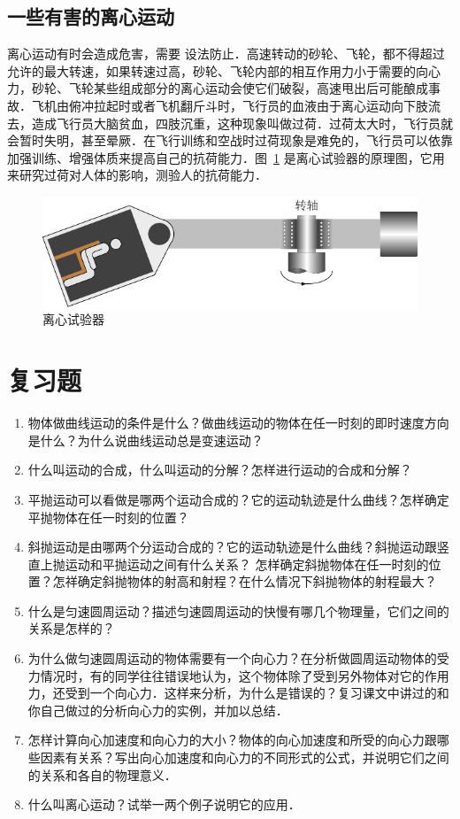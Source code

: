\subsection{一些有害的离心运动} 

离心运动有时会造成危害，需要
设法防止．高速转动的砂轮、飞轮，都不得超过允许的最大转速，如果转速过高，砂轮、飞轮内部的相互作用力小于需要的向心力，砂轮、飞轮某些组成部分的离心运动会使它们破裂，高速甩出后可能酿成事故．飞机由俯冲拉起时或者飞机翻斤斗时，飞行员的血液由于离心运动向下肢流去，造成飞行员大脑贫血，四肢沉重，这种现象叫做过荷．过荷太大时，飞行员就会暂时失明，甚至晕厥．在飞行训练和空战时过荷现象是难免的，飞行员可以依靠加强训练、增强体质来提高自己的抗荷能力．图~\ref{fig_A_4-31} 是离心试验器的原理图，它用来研究过荷对人体的影响，测验人的抗荷能力．
\begin{figure}[htbp]
    \centering
    \includegraphics{fig/A/4-31.pdf}
    \caption{离心试验器}\label{fig_A_4-31}
\end{figure}

\section*{复习题}

\begin{enumerate}
	\item 物体做曲线运动的条件是什么？做曲线运动的物体在任一时刻的即时速度方向是什么？为什么说曲线运动总是变速运动？
\item 什么叫运动的合成，什么叫运动的分解？怎样进行运动的合成和分解？
\item 平抛运动可以看做是哪两个运动合成的？它的运动轨迹是什么曲线？怎样确定平抛物体在任一时刻的位置？
\item 斜抛运动是由哪两个分运动合成的？它的运动轨迹是什么曲线？斜抛运动跟竖直上抛运动和平抛运动之间有什么关系？
怎样确定斜抛物体在任一时刻的位置？怎祥确定斜抛物体的射高和射程？在什么情况下斜抛物体的射程最大？
\item 什么是匀速圆周运动？描述匀速圆周运动的快慢有哪几个物理量，它们之间的关系是怎样的？
\item 为什么做匀速圆周运动的物体需要有一个向心力？在分析做圆周运动物体的受力情况时，有的同学往往错误地认为，这个物体除了受到另外物体对它的作用力，还受到一个向心力．这样来分析，为什么是错误的？复习课文中讲过的和你自己做过的分析向心力的实例，并加以总结．
\item 怎样计算向心加速度和向心力的大小？物体的向心加速度和所受的向心力跟哪些因素有关系？写出向心加速度和向心力的不同形式的公式，并说明它们之间的关系和各自的物理意义．
\item  什么叫离心运动？试举一两个例子说明它的应用．
\end{enumerate}


